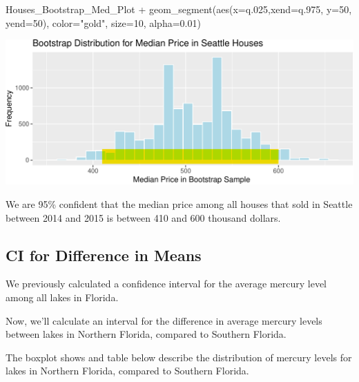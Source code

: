 \documentclass[
  letterpaper,
  DIV=11,
  numbers=noendperiod]{scrreprt}
\newenvironment{Shaded}{\begin{snugshade}}{\end{snugshade}}
\newcommand{\AttributeTok}[1]{\textcolor[rgb]{0.40,0.45,0.13}{#1}}
\newcommand{\DecValTok}[1]{\textcolor[rgb]{0.68,0.00,0.00}{#1}}
\newcommand{\FloatTok}[1]{\textcolor[rgb]{0.68,0.00,0.00}{#1}}
\newcommand{\FunctionTok}[1]{\textcolor[rgb]{0.28,0.35,0.67}{#1}}
\newcommand{\NormalTok}[1]{\textcolor[rgb]{0.00,0.23,0.31}{#1}}
\newcommand{\SpecialCharTok}[1]{\textcolor[rgb]{0.37,0.37,0.37}{#1}}
\newcommand{\StringTok}[1]{\textcolor[rgb]{0.13,0.47,0.30}{#1}}
\begin{document}
\begin{Shaded}
\begin{Highlighting}[]
\NormalTok{Houses\_Bootstrap\_Med\_Plot }\SpecialCharTok{+} 
  \FunctionTok{geom\_segment}\NormalTok{(}\FunctionTok{aes}\NormalTok{(}\AttributeTok{x=}\NormalTok{q}\FloatTok{.025}\NormalTok{,}\AttributeTok{xend=}\NormalTok{q}\FloatTok{.975}\NormalTok{, }\AttributeTok{y=}\DecValTok{50}\NormalTok{, }\AttributeTok{yend=}\DecValTok{50}\NormalTok{), }
               \AttributeTok{color=}\StringTok{"gold"}\NormalTok{, }\AttributeTok{size=}\DecValTok{10}\NormalTok{, }\AttributeTok{alpha=}\FloatTok{0.01}\NormalTok{) }
\end{Highlighting}
\end{Shaded}

\includegraphics{Ch3_files/figure-pdf/unnamed-chunk-99-1.pdf}

We are 95\% confident that the median price among all houses that sold
in Seattle between 2014 and 2015 is between 410 and 600 thousand
dollars.

\subsection{CI for Difference in
Means}\label{ci-for-difference-in-means}

We previously calculated a confidence interval for the average mercury
level among all lakes in Florida.

Now, we'll calculate an interval for the difference in average mercury
levels between lakes in Northern Florida, compared to Southern Florida.

The boxplot shows and table below describe the distribution of mercury
levels for lakes in Northern Florida, compared to Southern Florida.
\end{document}
